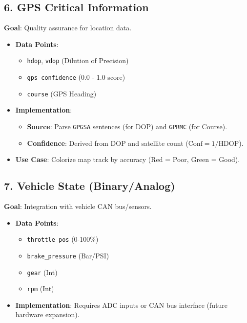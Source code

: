 \documentclass[11pt,a4paper]{article}
\begin{document}
\subsection{6. GPS Critical Information}
\textbf{Goal}: Quality assurance for location data.
\begin{itemize}
    \item \textbf{Data Points}:
    \begin{itemize}
        \item \texttt{hdop}, \texttt{vdop} (Dilution of Precision)
        \item \texttt{gps\_confidence} (0.0 - 1.0 score)
        \item \texttt{course} (GPS Heading)
    \end{itemize}
    \item \textbf{Implementation}:
    \begin{itemize}
        \item \textbf{Source}: Parse \texttt{GPGSA} sentences (for DOP) and \texttt{GPRMC} (for Course).
        \item \textbf{Confidence}: Derived from DOP and satellite count ($\text{Conf} = 1 / \text{HDOP}$).
    \end{itemize}
    \item \textbf{Use Case}: Colorize map track by accuracy (Red = Poor, Green = Good).
\end{itemize}

\subsection{7. Vehicle State (Binary/Analog)}
\textbf{Goal}: Integration with vehicle CAN bus/sensors.
\begin{itemize}
    \item \textbf{Data Points}:
    \begin{itemize}
        \item \texttt{throttle\_pos} (0-100\%)
        \item \texttt{brake\_pressure} (Bar/PSI)
        \item \texttt{gear} (Int)
        \item \texttt{rpm} (Int)
    \end{itemize}
    \item \textbf{Implementation}: Requires ADC inputs or CAN bus interface (future hardware expansion).
\end{itemize}
\end{document}
